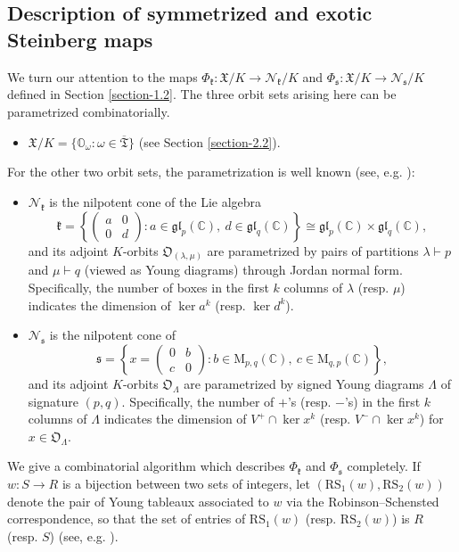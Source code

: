 \documentclass[ALCO,Unicode]{cedram}
\newcommand{\fk}{\mathfrak{k}}
\newcommand{\fs}{\mathfrak{s}}
\newcommand{\gl}{\mathfrak{gl}}
\newcommand{\RS}{\mathrm{RS}}
\newcommand{\Mat}{\mathrm{M}}
\newcommand{\Xorbit}{\mathbb{O}}
\newcommand{\Nkorbit}{\mathfrak{O}}
\newcommand{\Nsorbit}{\mathfrak{O}}
\newcommand{\nilpotentsof}[1]{\mathcal{N}_{#1}}
\newcommand{\ppermutationsof}{\mathfrak{T}}
\newcommand{\parameters}{\overline{\ppermutationsof}}
\newcommand{\Xfv}{\mathfrak{X}}
\newcommand{\mC}{\mathbb{C}}
\begin{document}
\subsection{Description of symmetrized and exotic Steinberg maps}

\label{section-2.3}


We turn our attention to the maps $\Phi_\fk:\Xfv/K\to \nilpotentsof{\fk}/K$ and $\Phi_\fs:\Xfv/K\to\nilpotentsof{\fs}/K$ defined in Section \ref{section-1.2}.
The three orbit sets arising here can be parametrized combinatorially.
\begin{itemize}
\item $\Xfv/K=\{\Xorbit_\omega:\omega\in\parameters\}$ (see Section \ref{section-2.2}).
\end{itemize}
For the other two orbit sets, the parametrization is well known (see, e.g. \cite{Collingwood-McGovern}):
\begin{itemize}
\item $\nilpotentsof{\fk}$ is the nilpotent cone of the Lie algebra
$$\fk=\left\{\begin{pmatrix} a & 0\\ 0 &
d\end{pmatrix}:a\in\gl_p(\mC),\
d\in\gl_q(\mC)\right\}\cong\gl_p(\mC)\times\gl_q(\mC),$$
and its adjoint
$K$-orbits $\Nkorbit_{(\lambda,\mu)}$ are parametrized by pairs of
partitions $\lambda\vdash p$ and $\mu\vdash q$ (viewed as Young
diagrams) through Jordan normal form. Specifically, the number of
boxes in the first $k$ columns of $\lambda$ (resp. $\mu$) indicates
the dimension of $\ker a^k$ (resp. $\ker d^k$).
\item $\nilpotentsof{\fs}$ is the nilpotent cone of
$$\fs=\left\{x=\begin{pmatrix} 0 & b\\ c &
0\end{pmatrix}:b\in\Mat_{p,q}(\mC),\ c\in\Mat_{q,p}(\mC)\right\},$$
and
its adjoint $K$-orbits $\Nsorbit_{\Lambda}$ are parametrized by
signed Young diagrams $\Lambda$ of signature $(p,q)$. Specifically,
the number of $+$'s (resp. $-$'s) in the first $k$ columns of
$\Lambda$ indicates the dimension of $V^+\cap\ker x^k$ (resp.
$V^-\cap\ker x^k$) for $x\in\Nsorbit_\Lambda$.

\end{itemize}

We give a combinatorial algorithm which describes $\Phi_\fk$ and $\Phi_\fs$ completely. If $w:S\to R$ is a bijection
between two sets of integers, let $(\RS_1(w),\RS_2(w))$ denote the
pair of Young tableaux associated to $w$ via the Robinson--Schensted
correspondence, so that the set of entries of $\RS_1(w)$ (resp.
$\RS_2(w)$) is $R$ (resp. $S$) (see, e.g. \cite{Fulton}).
\end{document}
